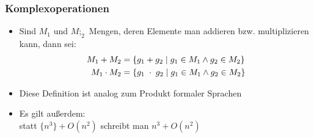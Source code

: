 \documentclass{article}
\newcommand{\set}[1]{\{#1\}}
\begin{document}
\subsubsection{Komplexoperationen}
\begin{itemize}
    \item Sind $M_1$ und $M;_2$ Mengen, deren Elemente man addieren bzw. multiplizieren kann, dann sei:
    \begin{align*}
        M_1+M_2 &= \set{g_1+g_2 \mid g_1 \in M_1 \land g_2 \in M_2}\\
        M_1\cdot M_2 
        &= \set{g_1 \hphantom{\cdot} \cdot \hphantom{\cdot} g_2 \mid g_1\in M_1 \land g_2\in M_2}
    \end{align*}
    \item Diese Definition ist analog zum Produkt formaler Sprachen
    \item Es gilt außerdem: \\
    statt $\set{n^3}+O(n^2)$ schreibt man $n^3+O(n^2)$
\end{itemize}
\end{document}
